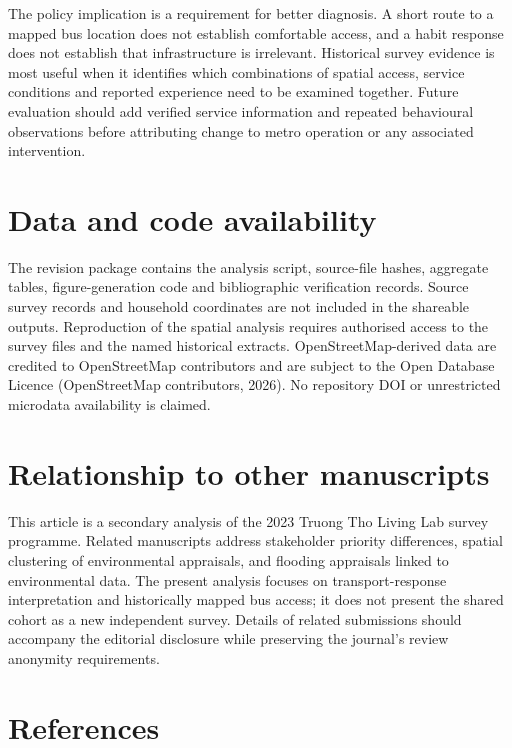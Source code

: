 \documentclass[
  11pt,
  a4paper,
]{article}
\begin{document}
The policy implication is a requirement for better diagnosis. A short
route to a mapped bus location does not establish comfortable access,
and a habit response does not establish that infrastructure is
irrelevant. Historical survey evidence is most useful when it identifies
which combinations of spatial access, service conditions and reported
experience need to be examined together. Future evaluation should add
verified service information and repeated behavioural observations
before attributing change to metro operation or any associated
intervention.

\section{Data and code availability}\label{data-and-code-availability}

The revision package contains the analysis script, source-file hashes,
aggregate tables, figure-generation code and bibliographic verification
records. Source survey records and household coordinates are not
included in the shareable outputs. Reproduction of the spatial analysis
requires authorised access to the survey files and the named historical
extracts. OpenStreetMap-derived data are credited to OpenStreetMap
contributors and are subject to the Open Database Licence (OpenStreetMap
contributors, 2026). No repository DOI or unrestricted microdata
availability is claimed.

\section{Relationship to other
manuscripts}\label{relationship-to-other-manuscripts}

This article is a secondary analysis of the 2023 Truong Tho Living Lab
survey programme. Related manuscripts address stakeholder priority
differences, spatial clustering of environmental appraisals, and
flooding appraisals linked to environmental data. The present analysis
focuses on transport-response interpretation and historically mapped bus
access; it does not present the shared cohort as a new independent
survey. Details of related submissions should accompany the editorial
disclosure while preserving the journal's review anonymity requirements.

\section*{References}\label{references}
\end{document}

